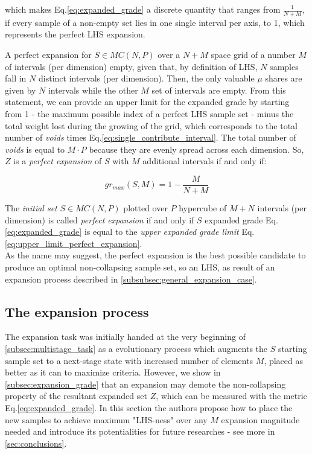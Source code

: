 \documentclass[12pt]{extarticle}
\newcommand{\meqref}[1]{Eq.\ref{#1}}
\begin{document}
which makes \meqref{eq:expanded_grade} a discrete quantity that ranges from $\frac{1}{N+M}$, if every sample of a non-empty set lies in one single interval per axis, to 1, which represents the perfect LHS expansion.

A perfect expansion for $S \in MC(N, P)$ over a $N+M$ space grid of a number $M$ of intervals (per dimension) empty, given that, by definition of LHS, $N$ samples fall in $N$ distinct intervals (per dimension). Then, the only valuable \textbf{$\mu$} shares are given by $N$ intervals while the other $M$ set of intervals are empty. From this statement, we can provide an upper limit for the expanded grade by starting from 1 - the maximum possible index of a perfect LHS sample set - minus the total weight lost during the growing of the grid, which corresponds to the total number of \textit{voids} times \meqref{eq:single_contribute_interval}. The total number of \textit{voids} is equal to $M \cdot P$ because they are evenly spread across each dimension. So, $Z$ is a \textit{perfect expansion} of $S$ with $M$ additional intervals if and only if:

\begin{equation}
\label{eq:upper_limit_perfect_expansion}
gr_{max}(S, M) = 1 - \frac{M}{N+M}
\end{equation}

The \textit{initial set} $S \in MC(N, P)$ plotted over $P$ hypercube of $M+N$ intervals (per dimension) is called \textit{perfect expansion} if and only if $S$ expanded grade \meqref{eq:expanded_grade} is equal to the \textit{upper expanded grade limit} \meqref{eq:upper_limit_perfect_expansion}. \\
As the name may suggest, the perfect expansion is the best possible candidate to produce an optimal non-collapsing sample set, so an LHS, as result of an expansion process described in \cref{subsubsec:general_expansion_case}.


\subsection{The expansion process}
The expansion task was initially handed at the very beginning of  \cref{subsec:multistage_task} as a evolutionary process which augments the $S$ starting sample set to a next-stage state with increased number of elements $M$, placed as better as it can to maximize criteria. However, we show in \cref{subsec:expansion_grade} that an expansion may demote the non-collapsing property of the resultant expanded set $Z$, which can be measured with the metric \meqref{eq:expanded_grade}. 
In this section the authors propose how to place the new samples to achieve maximum "LHS-ness" over any $M$ expansion magnitude needed and introduce its potentialities for future researches - see more in \cref{sec:conclusions}.
\end{document}
